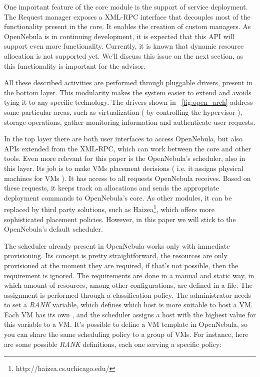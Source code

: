 One important feature of the core module is the support of service deployment. The Request manager exposes a XML-RPC interface that decouples most of the functionality present in the core. It enables the creation of custom managers. As OpenNebula is in continuing development, it is expected that this API will support even more functionality. Currently, it is known that dynamic resource allocation is not supported yet. We'll discuss this issue on the next section, as this functionality is important for the advisor.

All these described activities are performed through pluggable drivers, present in the bottom layer. This modularity makes the system easier to extend and avoids tying it to any specific technology. The drivers shown in ~\ref{fig:open_arch}  address some particular areas, such as virtualization ( by controlling the hypervisor ), storage operations, gather monitoring information and authenticate user requests.

In the top layer there are both user interfaces to access OpenNebula, but also APIs extended from the XML-RPC, which can work between the core and other tools. Even more relevant for this paper is the OpenNebula's scheduler, also in this layer. Its job is to make VMs placement decisions ( i.e. it assigns physical machines for VMs ). It has access to all requests OpenNebula receives. Based on these requests, it keeps track on allocations and sends the appropriate deployment commands to OpenNebula's core. As other modules, it can be replaced by third party solutions, such as Haizea\footnote{http://haizea.cs.uchicago.edu/},  which offers more sophisticated placement policies. However, in this paper we will stick to the OpenNebula's default scheduler.

The scheduler already present in OpenNebula works only with immediate provisioning. Its concept is pretty straightforward, the resources are only provisioned at the moment they are required, if that's not possible, then the requirement is ignored. The requirements are done in a manual and static way, in which amount of resources, among other configurations, are defined in a file. The assignment is performed through a classification policy.  The administrator needs to set a \textit{RANK} variable, which defines which host is more suitable to host a VM. Each VM has its own , and the scheduler assigns a host with the highest value for this variable to a VM. It's possible to define a VM template in OpenNebula, so you can share the same scheduling policy  to a group of VMs. For instance, here are some possible \textit{RANK} definitions, each one serving a specific policy:

